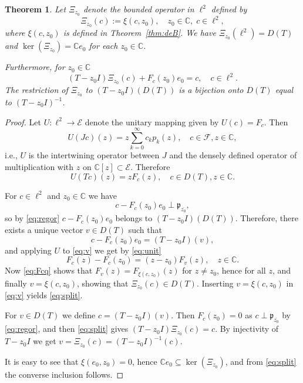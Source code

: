 \documentclass [12pt]{article}
\newtheorem{thm}{Theorem}[section]
\newcommand{\C}{\mathbb{C}}
\begin{document}
\begin{thm}\label{thm:para} Let $\Xi_{z_0}$ denote the bounded operator in $\ell^2$ defined by
\begin{equation}\label{eq:para}
\Xi_{z_0}(c):=\xi(c,z_0),\quad z_0\in\C,\;c\in\ell^2,
\end{equation}
where $\xi(c,z_0)$ is defined in Theorem~\ref{thm:deB}.
We have $\Xi_{z_0}(\ell^2)=D(T)$  and $\ker(\Xi_{z_0})=\C e_0$ for each $z_0\in\C$.

Furthermore, for $z_0\in\C$
\begin{equation}\label{eq:split}
(T-z_0 I)\Xi_{z_0}(c)+F_c(z_0)e_0=c, \quad c\in\ell^2.
\end{equation}
The restriction of $\Xi_{z_0}$ to $(T-z_0I)(D(T))$ is a bijection onto $D(T)$ equal to $(T-z_0I)^{-1}$.
\end{thm}

\begin{proof} Let $U:\ell^2\to \mathcal E$ denote the unitary mapping given by  $U(c)=F_c$. Then
\begin{equation*}
U(Jc)(z)=z\sum_{k=0}^\infty c_kp_k(z),\quad c\in\mathcal F, z\in \C,
\end{equation*}
i.e., $U$ is the intertwining operator between $J$ and the densely defined operator of multiplication with $z$ on $\C[z]\subset \mathcal E$. Therefore 
\begin{equation}\label{eq:unit}
U(Tc)(z)=zF_c(z),\quad c\in D(T), z\in\C.
\end{equation}

For $c\in\ell^2$ and $z_0\in\C$ we have 
$$
c-F_c(z_0)e_0 \perp \mathfrak{p}_{\overline{z_0}},
$$
so by \eqref{eq:regor} $c-F_c(z_0)e_0$ belongs to $(T-z_0 I)(D(T))$. Therefore, there exists a unique vector $v\in D(T)$ such that
\begin{equation}\label{eq:v}
c-F_c(z_0)e_0 =(T-z_0 I)(v),
\end{equation}
and applying $U$ to \eqref{eq:v} we get by \eqref{eq:unit}
$$
F_c(z)-F_c(z_0)=(z-z_0)F_v(z),\quad z\in\C.
$$
Now \eqref{eq:Fcq} shows that $F_v(z)=F_{\xi(c,z_0)}(z)$  for $z\neq z_0$, hence for all $z$, and finally  $v=\xi(c,z_0)$, showing that $\Xi_{z_0}(c)\in D(T)$. Inserting $v=\xi(c,z_0)$ in \eqref{eq:v} yields \eqref{eq:split}. 

For $v\in D(T)$ we define $c=(T-z_0 I)(v)$. Then $F_c(z_0)=0$ as $c\perp \mathfrak{p}_{\overline{z_0}}$ by \eqref{eq:regor}, and then \eqref{eq:split} gives $(T-z_0I)\Xi_{z_0}(c)=c$. By injectivity of $T-z_0I$ we get $v=\Xi_{z_0}(c)=(T-z_0 I)^{-1}(c)$.

It is easy to see that $\xi(e_0,z_0)=0$, hence $\C e_0\subseteq \ker(\Xi_{z_0})$, and from \eqref{eq:split} the converse inclusion follows.
\end{proof}
\end{document}

